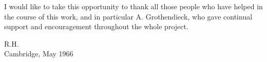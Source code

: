 \documentclass[12pt]{book}
\newcommand{\Cat}[1]{\mathcal{#1}}
\newcommand{\Sheaf}[1]{\mathcal{#1}}
\begin{document}
I would like to take this opportunity to thank all those people who have helped in the course of this work, and in particular A. Grothendieck, who gave continual support and encouragement throughout the whole project.

\vspace{\baselineskip}
\raggedleft
R.H.\\
Cambridge, May 1966

\endpreface

\end{document}
